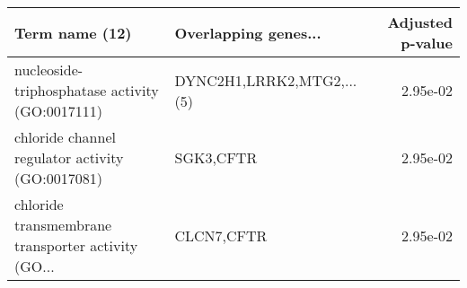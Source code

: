 \begin{tabular}{llr}
\toprule
                                    Term name (12) &      Overlapping genes... &  Adjusted p-value \\
\midrule
   nucleoside-triphosphatase activity (GO:0017111) & DYNC2H1,LRRK2,MTG2,...(5) &          2.95e-02 \\
  chloride channel regulator activity (GO:0017081) &                 SGK3,CFTR &          2.95e-02 \\
chloride transmembrane transporter activity (GO... &                CLCN7,CFTR &          2.95e-02 \\
\bottomrule
\end{tabular}
